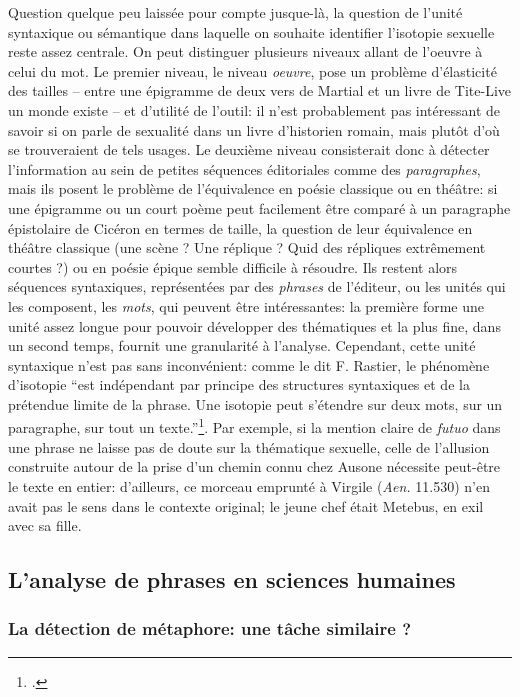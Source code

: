Question quelque peu laissée pour compte jusque-là, la question de l'unité syntaxique ou sémantique dans laquelle on souhaite identifier l'isotopie sexuelle reste assez centrale. On peut distinguer plusieurs niveaux allant de l'oeuvre à celui du mot. Le premier niveau, le niveau \textit{oeuvre}, pose un problème d'élasticité des tailles -- entre une épigramme de deux vers de Martial et un livre de Tite-Live un monde existe -- et d'utilité de l'outil: il n'est probablement pas intéressant de savoir si on parle de sexualité dans un livre d'historien romain, mais plutôt d'où se trouveraient de tels usages. Le deuxième niveau consisterait donc à détecter l'information au sein de petites séquences éditoriales comme des  \textit{paragraphes}, mais ils posent le problème de l'équivalence en poésie classique ou en théâtre: si une épigramme ou un court poème peut facilement être comparé à un paragraphe épistolaire de Cicéron en termes de taille, la question de leur équivalence en théâtre classique (une scène ? Une réplique ? Quid des répliques extrêmement courtes ?) ou en poésie épique semble difficile à résoudre. Ils restent alors séquences syntaxiques, représentées par des \textit{phrases} de l'éditeur, ou les unités qui les composent, les \textit{mots}, qui peuvent être intéressantes: la première forme une unité assez longue pour pouvoir développer des thématiques et la plus fine, dans un second temps, fournit une granularité à l'analyse. Cependant, cette unité syntaxique n'est pas sans inconvénient: comme le dit F. Rastier, le phénomène d'isotopie \enquote{est indépendant par principe des structures syntaxiques et de la prétendue limite de la phrase. Une isotopie peut s'étendre sur deux mots, sur un paragraphe, sur tout un texte.}\footcite[p. 34]{rastier_isotopie_1985}. Par exemple, si la mention claire de \textit{futuo} dans une phrase ne laisse pas de doute sur la thématique sexuelle, celle de l'allusion construite autour de la prise d'un chemin connu chez Ausone nécessite peut-être le texte en entier: d'ailleurs, ce morceau emprunté à Virgile (\textit{Aen.} 11.530) n'en avait pas le sens dans le contexte original; le jeune chef était Metebus, en exil avec sa fille. 

\subsection{L'analyse de phrases en sciences humaines}

\subsubsection{La détection de métaphore: une tâche similaire ?}

